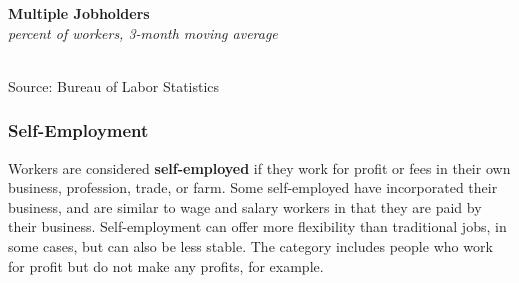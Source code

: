 \documentclass{report}
\makeatletter
\newcommand{\tbllink}[1]{\href{https://raw.githubusercontent.com/bdecon/US-chartbook/master/chartbook/data/#1}{\faTable}}
\newcommand*\short[1]{\expandafter\@gobbletwo\number\numexpr#1\relax}
\newcommand{\shdateaxisticks}{
		date coordinates in=x, axis line style={draw=none},
		xmax={2022-10-31},
		max space between ticks=40,	    
		xtick={{1990-01-01}, {1995-01-01}, {2000-01-01}, 
			{2005-01-01}, {2010-01-01}, {2015-01-01}, {2020-01-01}},
		minor xtick={},
		enlarge y limits={0.06}, enlarge x limits={0.01},
		}
\newcommand{\thickline}[4]{\addplot[ultra thick, no markers, color=#1] 
		table [x=#2, y=#3, col sep=comma] {#4};	}
\newcommand{\rebars}{
		\fill[color=black!10] (axis cs:{2007-12-01},\pgfkeysvalueof{/pgfplots/ymin}) rectangle 
			(axis cs:{2009-07-01}, \pgfkeysvalueof{/pgfplots/ymax});
		\fill[color=black!10] (axis cs:{2001-03-01},\pgfkeysvalueof{/pgfplots/ymin}) rectangle 
			(axis cs:{2001-11-01}, \pgfkeysvalueof{/pgfplots/ymax});
		\fill[color=black!10] (axis cs:{2020-02-01},\pgfkeysvalueof{/pgfplots/ymin}) rectangle 
			(axis cs:{2020-05-01}, \pgfkeysvalueof{/pgfplots/ymax});}
\makeatother
\begin{document}
{\begin{minipage}{0.76\textwidth}
\begin{minipage}{0.56\textwidth}
\normalsize \textbf{Multiple Jobholders}\\
\footnotesize{\textit{percent of workers, 3-month moving average}}\\
\hspace*{-2mm} \\
\footnotesize{Source: Bureau of Labor Statistics} \hfill \tbllink{mjh.csv} 
\end{minipage} \hfill
\begin{minipage}{0.38\textwidth}
\small 
\end{minipage}
\end{minipage}
\newpage
\begin{minipage}{0.76\textwidth}
\subsubsection*{Self-Employment}
\small Workers are considered \textbf{self-employed} if they work for profit or fees in their own business, profession, trade, or farm. Some self-employed have incorporated their business, and are similar to wage and salary workers in that they are paid by their business. Self-employment can offer more flexibility than traditional jobs, in some cases, but can also be less stable. The category includes people who work for profit but do not make any profits, for example. 


\vspace{0.5mm}


\end{minipage}}
\end{document}
